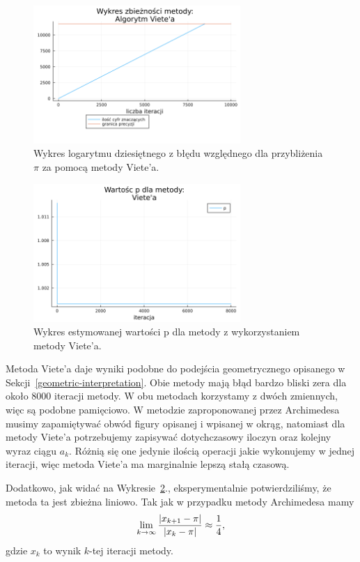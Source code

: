 \begin{figure}[!h]\centering
    \renewcommand{\figurename}{Wykres}
    \includegraphics[width=0.7\textwidth]{../prog/viete_log_error.png}
    \caption{Wykres logarytmu dziesiętnego z błędu względnego dla przybliżenia $\pi$ za pomocą metody Viete'a.}
    \label{viete-error}
\end{figure}

\begin{figure}[!h]\centering
    \renewcommand{\figurename}{Wykres}
    \includegraphics[width=0.7\textwidth]{../prog/viete_error_ratio.png}
    \caption{Wykres estymowanej wartości p dla metody z wykorzystaniem metody Viete'a.}
    \label{viete-convergence}
\end{figure}

Metoda Viete'a daje wyniki podobne do podejścia geometrycznego opisanego w Sekcji~\ref{geometric-interpretation}. Obie metody mają błąd bardzo bliski zera dla około 8000 iteracji metody. W obu metodach korzystamy z dwóch zmiennych, więc są podobne pamięciowo. W metodzie zaproponowanej przez Archimedesa musimy zapamiętywać obwód figury opisanej i wpisanej w okrąg, natomiast dla metody Viete'a potrzebujemy zapisywać dotychczasowy iloczyn oraz kolejny wyraz ciągu $a_k$. Różnią się one jedynie ilością operacji jakie wykonujemy w jednej iteracji, więc metoda Viete'a ma marginalnie lepszą stałą czasową.

Dodatkowo, jak widać na Wykresie~\ref{viete-convergence}., eksperymentalnie potwierdziliśmy, że metoda ta jest zbieżna liniowo. Tak jak w przypadku metody Archimedesa mamy
$$\lim_{k\to \infty}{|x_{k+1}-\pi|\over |x_k-\pi|}\approx\frac1{4},$$
gdzie $x_k$ to wynik $k$-tej iteracji metody.